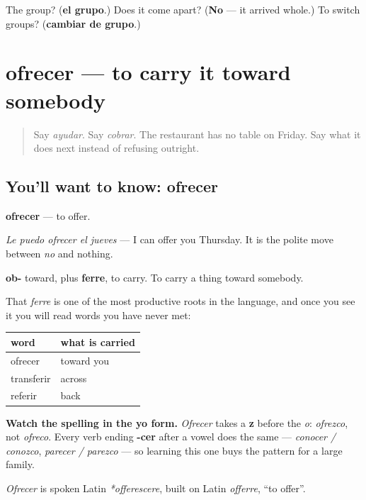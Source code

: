 \begin{tcolorbox}[breakable,colback=teal!4,colframe=teal!35!black,title={Before you move on}]
The group? (\textbf{el grupo}.) Does it come apart? (\textbf{No} — it arrived whole.) To switch groups? (\textbf{cambiar de grupo}.)
\end{tcolorbox}
\section[ofrecer]{ofrecer — to carry it toward somebody}

\label{lesson:ES-C436-ofrecer}



\begin{quote}
Say \emph{ayudar}. Say \emph{cobrar}. The restaurant has no table on Friday. Say what it does next instead of refusing outright.
\end{quote}

\subsection*{You'll want to know: ofrecer}
\textbf{ofrecer} — to offer.

\emph{Le puedo ofrecer el jueves} — I can offer you Thursday. It is the polite move between \emph{no} and nothing.

\begin{cousinweb}
\textbf{ob-} toward, plus \textbf{ferre}, to carry. To carry a thing toward somebody.

That \emph{ferre} is one of the most productive roots in the language, and once you see it you will read words you have never met:

\noindent
\begin{tabularx}{\linewidth}{@{}>{\raggedright\arraybackslash}X>{\raggedright\arraybackslash}X@{}}
\toprule
\textbf{word} & \textbf{what is carried} \\
\midrule
ofrecer & toward you \\
transferir & across \\
referir & back \\
\bottomrule
\end{tabularx}

\textbf{Watch the spelling in the yo form.} \emph{Ofrecer} takes a \textbf{z} before the \emph{o}: \emph{ofrezco}, not \emph{ofreco}. Every verb ending \textbf{-cer} after a vowel does the same — \emph{conocer / conozco}, \emph{parecer / parezco} — so learning this one buys the pattern for a large family.

\emph{Ofrecer} is spoken Latin \emph{*offerescere}, built on Latin \emph{offerre}, \textquotedblleft{}to offer\textquotedblright{}.
\end{cousinweb}

